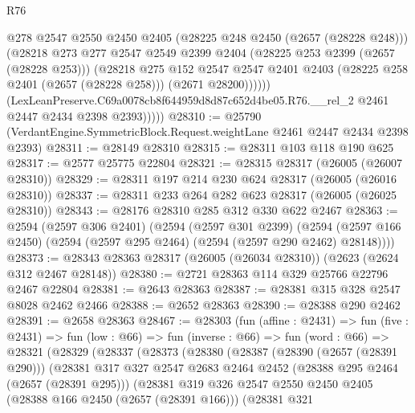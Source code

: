 \begin{lexlean}{R76}
\begin{coremodule}
                  @278
                  @2547
                  @2550
                  @2450
                  @2405
                  (@28225 @248 @2450 (@2657 (@28228 @248)))
                  (@28218
                    @273
                    @277
                    @2547
                    @2549
                    @2399
                    @2404
                    (@28225 @253 @2399 (@2657 (@28228 @253)))
                    (@28218
                      @275
                      @152
                      @2547
                      @2547
                      @2401
                      @2403
                      (@28225 @258 @2401 (@2657 (@28228 @258)))
                      (@2671 @28200))))))
            (LexLeanPreserve.C69a0078cb8f644959d8d87c652d4be05.R76.__rel_2
              @2461
              @2447
              @2434
              @2398
              @2393)))))
@28310 := @25790 (VerdantEngine.SymmetricBlock.Request.weightLane @2461 @2447 @2434 @2398 @2393)
@28311 := @28149 @28310
@28315 := @28311 @103 @118 @190 @625
@28317 := @2577 @25775 @22804
@28321 := @28315 @28317 (@26005 (@26007 @28310))
@28329 := @28311 @197 @214 @230 @624 @28317 (@26005 (@26016 @28310))
@28337 := @28311 @233 @264 @282 @623 @28317 (@26005 (@26025 @28310))
@28343 := @28176 @28310 @285 @312 @330 @622 @2467
@28363 := @2594
    (@2597 @306 @2401)
    (@2594
      (@2597 @301 @2399)
      (@2594 (@2597 @166 @2450) (@2594 (@2597 @295 @2464) (@2594 (@2597 @290 @2462) @28148))))
@28373 := @28343 @28363 @28317 (@26005 (@26034 @28310)) (@2623 (@2624 @312 @2467 @28148))
@28380 := @2721 @28363 @114 @329 @25766 @22796 @2467 @22804
@28381 := @2643 @28363
@28387 := @28381 @315 @328 @2547 @8028 @2462 @2466
@28388 := @2652 @28363
@28390 := @28388 @290 @2462
@28391 := @2658 @28363
@28467 := @28303
    (fun (affine : @2431) =>
    fun (five : @2431) =>
    fun (low : @66) =>
    fun (inverse : @66) =>
    fun (word : @66) =>
    @28321
      (@28329
        (@28337
          (@28373
            (@28380
              (@28387
                (@28390 (@2657 (@28391 @290)))
                (@28381
                  @317
                  @327
                  @2547
                  @2683
                  @2464
                  @2452
                  (@28388 @295 @2464 (@2657 (@28391 @295)))
                  (@28381
                    @319
                    @326
                    @2547
                    @2550
                    @2450
                    @2405
                    (@28388 @166 @2450 (@2657 (@28391 @166)))
                    (@28381
                      @321

\end{coremodule}
\end{lexlean}
